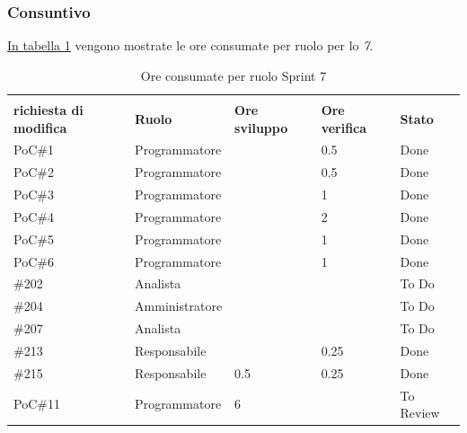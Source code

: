 \subsubsection{Consuntivo}
\hyperref[tab:sprint7_ore_consumate]{In tabella \ref{tab:sprint7_ore_consumate}} vengono mostrate le ore consumate per ruolo per lo \textit{ 7}.

\begin{table}[H]
    \centering
    \begin{tabular}{| l | l | l | l | l |}
        \hline
            \makecell{\textbf{Identificativo} \\ \textbf{richiesta di modifica}} &
            \textbf{Ruolo} &
            \textbf{Ore sviluppo} &
            \textbf{Ore verifica} &
            \textbf{Stato}\\
        \hline
        PoC\#1 & Programmatore &  & 0.5 & Done\\
        \hline
        PoC\#2 & Programmatore &  & 0.5 & Done\\
        \hline
        PoC\#3 & Programmatore &  & 1 & Done\\
        \hline
        PoC\#4 & Programmatore &  & 2 & Done\\
        \hline
        PoC\#5 & Programmatore &  & 1 & Done\\
        \hline
        PoC\#6 & Programmatore &  & 1 & Done\\
        \hline
        \#202 & Analista &  &  & To Do\\
        \hline
        \#204 & Amministratore &  &  & To Do\\
        \hline
        \#207 & Analista &  &  & To Do\\
        \hline
        \#213 & Responsabile &  & 0.25 & Done\\
        \hline
        \#215 & Responsabile & 0.5 & 0.25 & Done\\
        \hline
        PoC\#11 & Programmatore & 6 & & To Review\\
        \hline
    \end{tabular}
    \caption{Ore consumate per ruolo Sprint 7}
    \label{tab:sprint7_ore_consumate} 
\end{table}